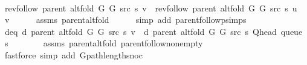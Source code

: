 \begin{isabellebody}
\ \ \isamarkupfalse%
\ {\isachardoublequoteopen}rev{\isacharunderscore}{\kern0pt}follow\ {\isacharparenleft}{\kern0pt}parent\ {\isacharparenleft}{\kern0pt}alt{\isacharunderscore}{\kern0pt}fold\ G{}\ G{}\ src\ s{\isacharparenright}{\kern0pt}{\isacharparenright}{\kern0pt}\ v\ {\isacharequal}{\kern0pt}\ rev{\isacharunderscore}{\kern0pt}follow\ {\isacharparenleft}{\kern0pt}parent\ {\isacharparenleft}{\kern0pt}alt{\isacharunderscore}{\kern0pt}fold\ G{}\ G{}\ src\ s{\isacharparenright}{\kern0pt}{\isacharparenright}{\kern0pt}\ {\isacharquery}{\kern0pt}u\ {\isacharat}{\kern0pt}\ {\isacharbrackleft}{\kern0pt}v{\isacharbrackright}{\kern0pt}{\isachardoublequoteclose}\isanewline
\ \ \ \ \isamarkupfalse%
\ assms{\isacharparenleft}{\kern0pt}{}{\isacharparenright}{\kern0pt}\ parent{\isacharunderscore}{\kern0pt}alt{\isacharunderscore}{\kern0pt}fold\isanewline
\ \ \ \ \isamarkupfalse%
\ {\isacharparenleft}{\kern0pt}simp\ add{\isacharcolon}{\kern0pt}\ parent{\isachardot}{\kern0pt}follow{\isacharunderscore}{\kern0pt}psimps{\isacharparenright}{\kern0pt}\isanewline
\ \ \isamarkupfalse%
\ d{\isacharunderscore}{\kern0pt}eq{\isacharcolon}{\kern0pt}\ {\isachardoublequoteopen}d\ {\isacharparenleft}{\kern0pt}parent\ {\isacharparenleft}{\kern0pt}alt{\isacharunderscore}{\kern0pt}fold\ G{}\ G{}\ src\ s{\isacharparenright}{\kern0pt}{\isacharparenright}{\kern0pt}\ v\ {\isacharequal}{\kern0pt}\ d\ {\isacharparenleft}{\kern0pt}parent\ {\isacharparenleft}{\kern0pt}alt{\isacharunderscore}{\kern0pt}fold\ G{}\ G{}\ src\ s{\isacharparenright}{\kern0pt}{\isacharparenright}{\kern0pt}\ {\isacharparenleft}{\kern0pt}Q{\isacharunderscore}{\kern0pt}head\ {\isacharparenleft}{\kern0pt}queue\ s{\isacharparenright}{\kern0pt}{\isacharparenright}{\kern0pt}\ {\isacharplus}{\kern0pt}\ {}{\isachardoublequoteclose}\isanewline
\ \ \ \ \isamarkupfalse%
\ assms{\isacharparenleft}{\kern0pt}{}{\isacharparenright}{\kern0pt}\ parent{\isacharunderscore}{\kern0pt}alt{\isacharunderscore}{\kern0pt}fold\ parent{\isachardot}{\kern0pt}follow{\isacharunderscore}{\kern0pt}non{\isacharunderscore}{\kern0pt}empty\isanewline
\ \ \ \ \isamarkupfalse%
\ {\isacharparenleft}{\kern0pt}fastforce\ simp\ add{\isacharcolon}{\kern0pt}\ G{\isachardot}{\kern0pt}path{\isacharunderscore}{\kern0pt}length{\isacharunderscore}{\kern0pt}snoc{\isacharparenright}{\kern0pt}\isanewline
\isanewline
\ \ \isamarkupfalse%

\end{isabellebody}
